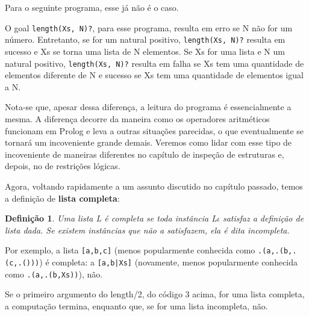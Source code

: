 \documentclass{article}
\newtheorem{definition}{Definição}[section]
\theoremstyle{remark}
\begin{document}
Para o seguinte programa, esse já não é o caso.


O goal {\tt length(Xs, N)?}, para esse programa, resulta em erro se N não for um número. Entretanto, se for um natural positivo, {\tt length(Xs, N)?} resulta em sucesso e Xs se torna uma lista de N elementos. Se Xs for uma lista e N um natural positivo, {\tt length(Xs, N)?} resulta em falha se Xs tem uma quantidade de elementos diferente de N e sucesso se Xs tem uma quantidade de elementos igual a N.

Nota-se que, apesar dessa diferença, a leitura do programa é essencialmente a mesma. A diferença decorre da maneira como os operadores aritméticos funcionam em Prolog e leva a outras situações parecidas, o que eventualmente se tornará um incoveniente grande demais. Veremos como lidar com esse tipo de incoveniente de maneiras diferentes no capítulo de inspeção de estruturas %
e, depois, no de restrições lógicas. %

Agora, voltando rapidamente a um assunto discutido no capítulo passado, temos a definição de \textbf{lista completa}:

\begin{definition} Uma lista L é completa se toda instância L$\iota$ satisfaz a definição de lista dada. Se existem instâncias que não a satisfazem, ela é dita incompleta.
\end{definition}

Por exemplo, a lista {\tt[a,b,c]} (menos popularmente conhecida como {\tt .(a,.(b,.(c,.()))}) é completa: a {\tt[a,b|Xs]} (novamente, menos popularmente conhecida como {\tt .(a,.(b,Xs))}), não.

Se o primeiro argumento do length/2, do código 3 acima, for uma lista completa, a computação termina, enquanto que, se for uma lista incompleta, não.
\end{document}
